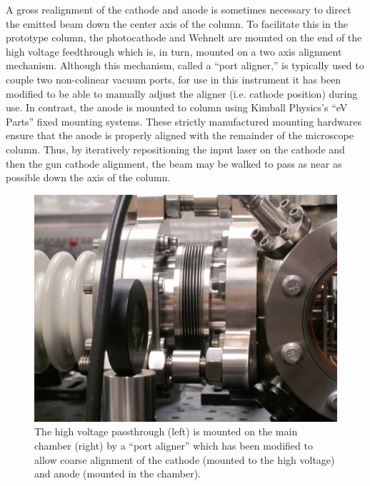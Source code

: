 A gross realignment of the cathode and anode is sometimes necessary to direct the emitted beam down the center axis of the column.
To facilitate this in the prototype column, the photocathode and Wehnelt are mounted on the end of the high voltage feedthrough which is, in turn, mounted on a two axis alignment mechanism.
Although this mechanism, called a ``port aligner,'' is typically used to couple two non-colinear vacuum ports, for use in this instrument it has been modified to be able to manually adjust the aligner (i.e. cathode position) during use.
In contrast, the anode is mounted to column using Kimball Physics's ``eV Parts'' fixed mounting systems.
These strictly manufactured mounting hardwares ensure that the anode is properly aligned with the remainder of the microscope column.
Thus, by iteratively repositioning the input laser on the cathode and then the gun cathode alignment, the beam may be walked to pass as near as possible down the axis of the column.

\begin{figure}
  \centering
  \includegraphics{aligner.jpg}
  \caption[Picture of the high-voltage side of the prototype UEM]{
    The high voltage passthrough (left) is mounted on the main chamber (right) by a ``port aligner'' which has been modified to allow coarse alignment of the cathode (mounted to the high voltage) and anode (mounted in the chamber).
  }
  \label{fig:aligner-pic}
\end{figure}



